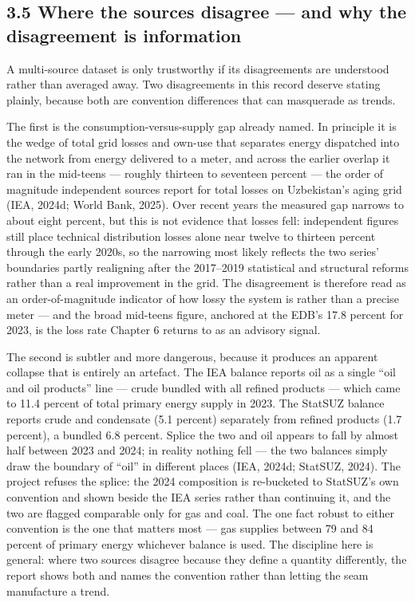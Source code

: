 \documentclass[10pt,twocolumn]{article}
\begin{document}
\subsection*{3.5 Where the sources disagree --- and why the disagreement is information}

A multi-source dataset is only trustworthy if its disagreements are understood rather than averaged away. Two disagreements in this record deserve stating plainly, because both are convention differences that can masquerade as trends.

The first is the consumption-versus-supply gap already named. In principle it is the wedge of total grid losses and own-use that separates energy dispatched into the network from energy delivered to a meter, and across the earlier overlap it ran in the mid-teens --- roughly thirteen to seventeen percent --- the order of magnitude independent sources report for total losses on Uzbekistan's aging grid (IEA, 2024d; World Bank, 2025). Over recent years the measured gap narrows to about eight percent, but this is not evidence that losses fell: independent figures still place technical distribution losses alone near twelve to thirteen percent through the early 2020s, so the narrowing most likely reflects the two series' boundaries partly realigning after the 2017--2019 statistical and structural reforms rather than a real improvement in the grid. The disagreement is therefore read as an order-of-magnitude indicator of how lossy the system is rather than a precise meter --- and the broad mid-teens figure, anchored at the EDB's 17.8 percent for 2023, is the loss rate Chapter 6 returns to as an advisory signal.

The second is subtler and more dangerous, because it produces an apparent collapse that is entirely an artefact. The IEA balance reports oil as a single ``oil and oil products'' line --- crude bundled with all refined products --- which came to 11.4 percent of total primary energy supply in 2023. The StatSUZ balance reports crude and condensate (5.1 percent) separately from refined products (1.7 percent), a bundled 6.8 percent. Splice the two and oil appears to fall by almost half between 2023 and 2024; in reality nothing fell --- the two balances simply draw the boundary of ``oil'' in different places (IEA, 2024d; StatSUZ, 2024). The project refuses the splice: the 2024 composition is re-bucketed to StatSUZ's own convention and shown beside the IEA series rather than continuing it, and the two are flagged comparable only for gas and coal. The one fact robust to either convention is the one that matters most --- gas supplies between 79 and 84 percent of primary energy whichever balance is used. The discipline here is general: where two sources disagree because they define a quantity differently, the report shows both and names the convention rather than letting the seam manufacture a trend.
\end{document}
